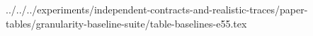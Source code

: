 ../../../experiments/independent-contracts-and-realistic-traces/paper-tables/granularity-baseline-suite/table-baselines-e55.tex